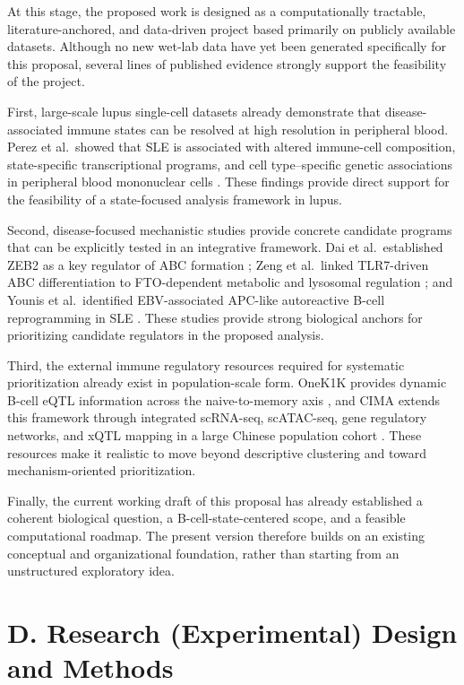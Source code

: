 At this stage, the proposed work is designed as a computationally tractable, literature-anchored, and data-driven project based primarily on publicly available datasets. Although no new wet-lab data have yet been generated specifically for this proposal, several lines of published evidence strongly support the feasibility of the project.

First, large-scale lupus single-cell datasets already demonstrate that disease-associated immune states can be resolved at high resolution in peripheral blood. Perez et al.\ showed that SLE is associated with altered immune-cell composition, state-specific transcriptional programs, and cell type--specific genetic associations in peripheral blood mononuclear cells \cite{Perez2022}. These findings provide direct support for the feasibility of a state-focused analysis framework in lupus.

Second, disease-focused mechanistic studies provide concrete candidate programs that can be explicitly tested in an integrative framework. Dai et al.\ established ZEB2 as a key regulator of ABC formation \cite{Dai2024}; Zeng et al.\ linked TLR7-driven ABC differentiation to FTO-dependent metabolic and lysosomal regulation \cite{Zeng2025}; and Younis et al.\ identified EBV-associated APC-like autoreactive B-cell reprogramming in SLE \cite{Younis2025}. These studies provide strong biological anchors for prioritizing candidate regulators in the proposed analysis.

Third, the external immune regulatory resources required for systematic prioritization already exist in population-scale form. OneK1K provides dynamic B-cell eQTL information across the naive-to-memory axis \cite{Yazar2022}, and CIMA extends this framework through integrated scRNA-seq, scATAC-seq, gene regulatory networks, and xQTL mapping in a large Chinese population cohort \cite{Yin2026}. These resources make it realistic to move beyond descriptive clustering and toward mechanism-oriented prioritization.

Finally, the current working draft of this proposal has already established a coherent biological question, a B-cell-state-centered scope, and a feasible computational roadmap. The present version therefore builds on an existing conceptual and organizational foundation, rather than starting from an unstructured exploratory idea.

\section*{D. Research (Experimental) Design and Methods}

